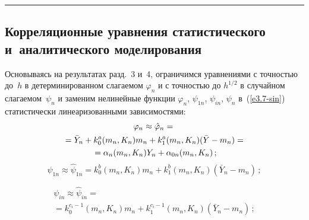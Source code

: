 \vspace*{18pt}

\hrule

\vspace*{6pt}

\begin{multicols}{2}

\section{Корреляционные уравнения статистического и~аналитического моделирования}

Основываясь на результатах разд.~3 и~4, ограничимся уравнениями с точностью до~$h$ 
в детерминированном слагаемом $\varphi_n$ и с точностью до  $h^{1/2}$ в случайном слагаемом~$\psi_n$ 
и заменим нелинейные функции $ \varphi_n$, $\psi_{1n}$, $\psi_{in}$, $\psi_n$ в~(\ref{e3.7-sin}) 
статистически линеаризованными зависимостями:
    \begin{multline*}
    \varphi_n \approx \hat \varphi_n ={}\\
    {}=\bar Y_n + k_0^a (m_n, K_n) m_n + k_1^a (m_n, K_n) (\bar Y - m_n) ={}\\
{}=\alp_n (m_n, K_n)Y_n +\alp_{0n} (m_n, K_n)\,; %
\end{multline*}
    \begin{equation*}
    \psi_{1n}\approx \hat \psi_{1n} = k_0^b (m_n, K_n) m_n + k_1^{b} (m_n, K_n) (\bar Y_n - m_n)\,; %
    \end{equation*}
    
    \vspace*{-12pt}
    
\begin{multline*}
\psi_{in}\approx \hat \psi_{in} = {}\\
{}=k_0^{c_i-1} (m_n, K_n) m_n + k_1^{c_i-1} (m_n, K_n) (\bar Y_n - m_n)\,; %
\end{multline*}
    
    
    \vspace*{-12pt}
    

\end{multicols}
